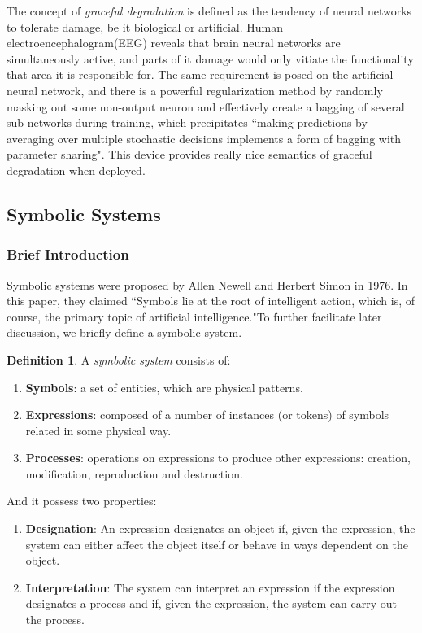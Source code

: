 \documentclass[letterpaper,10pt]{article}
\theoremstyle{definition}
\newtheorem{defn}{Definition}
\begin{document}
The concept of \emph{graceful degradation} is defined as the tendency of neural
networks to tolerate damage, be it biological or artificial. Human
electroencephalogram(EEG) reveals that brain neural networks are simultaneously
active, and parts of it damage would only vitiate the functionality that area
it is responsible for. The same requirement is posed on the artificial neural
network, and there is a powerful regularization method\cite{Srivastava2014} by randomly masking out
some non-output neuron and effectively create a bagging of several sub-networks
during training, which precipitates ``making predictions by averaging over multiple
stochastic decisions implements a form of bagging with parameter sharing"\cite{goodfellow2016deep}. This device provides really nice semantics of graceful
degradation when deployed.

\subsection{Symbolic Systems}

\subsubsection{Brief Introduction}

Symbolic systems were proposed by Allen Newell and Herbert Simon in
1976\cite{newell1976computer}. In this paper, they claimed ``Symbols lie at the
root of intelligent action, which is, of course, the primary topic of
artificial intelligence."To further facilitate later discussion, we briefly define a symbolic system. 


\begin{defn}
A \emph{symbolic system} consists of:
\begin{enumerate}[label=(\alph*), noitemsep]
\item \textbf{Symbols}: a set of entities, which are physical patterns.
\item \textbf{Expressions}: composed of a number of instances (or tokens) of symbols related in some physical way.
\item \textbf{Processes}: operations on expressions to produce other expressions: creation, modification, reproduction and destruction.
\end{enumerate}
\end{defn}

\noindent And it possess two properties\cite{newell1976computer}:

\begin{enumerate}[label={}]
\item \textbf{Designation}: An expression designates an object if, given the expression, the system can either affect the object itself or behave in ways dependent on the object.
\item \textbf{Interpretation}: The system can interpret an expression if the expression designates a process and if, given the expression, the system can carry out the process. 
\end{enumerate}
\end{document}
